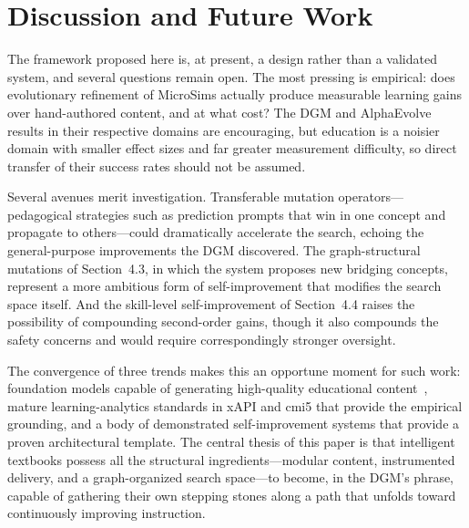 \section{Discussion and Future Work}

The framework proposed here is, at present, a design rather than a validated
system, and several questions remain open. The most pressing is empirical:
does evolutionary refinement of MicroSims actually produce measurable learning
gains over hand-authored content, and at what cost? The DGM and AlphaEvolve
results in their respective domains are encouraging, but education is a noisier
domain with smaller effect sizes and far greater measurement difficulty, so
direct transfer of their success rates should not be assumed.

Several avenues merit investigation. Transferable mutation operators---pedagogical
strategies such as prediction prompts that win in one concept and propagate to
others---could dramatically accelerate the search, echoing the general-purpose
improvements the DGM discovered. The graph-structural mutations of
Section~4.3, in which the system proposes new bridging concepts, represent a
more ambitious form of self-improvement that modifies the search space itself.
And the skill-level self-improvement of Section~4.4 raises the possibility of
compounding second-order gains, though it also compounds the safety concerns
and would require correspondingly stronger oversight.

The convergence of three trends makes this an opportune moment for such work:
foundation models capable of generating high-quality educational
content~\cite{mccreary2025claudeskills}, mature learning-analytics standards
in xAPI and cmi5 that provide the empirical grounding, and a body of
demonstrated self-improvement systems that provide a proven architectural
template. The central thesis of this paper is that intelligent textbooks
possess all the structural ingredients---modular content, instrumented
delivery, and a graph-organized search space---to become, in the DGM's phrase,
capable of gathering their own stepping stones along a path that unfolds toward
continuously improving instruction.
